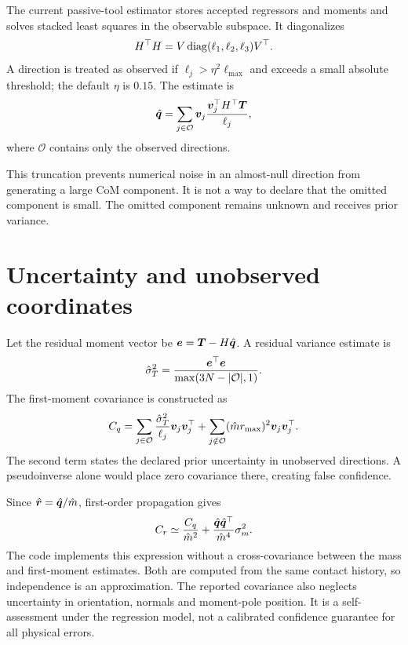 The current passive-tool estimator stores accepted regressors and moments and solves stacked least squares in the observable subspace. It diagonalizes
\begin{equation}
H^\top H=V\operatorname{diag}(\ell_1,\ell_2,\ell_3)V^\top.
\end{equation}
A direction is treated as observed if $\ell_j>\eta^2\ell_{\max}$ and exceeds a small absolute threshold; the default $\eta$ is $0.15$. The estimate is
\begin{equation}
\hat{\bm{q}}=\sum_{j\in\mathcal O}
\bm{v}_j\frac{\bm{v}_j^\top H^\top\bm{T}}{\ell_j},
\label{eq:subspace-estimator}
\end{equation}
where $\mathcal O$ contains only the observed directions.

This truncation prevents numerical noise in an almost-null direction from generating a large CoM component. It is not a way to declare that the omitted component is small. The omitted component remains unknown and receives prior variance.

\section{Uncertainty and unobserved coordinates}

Let the residual moment vector be $\bm{e}=\bm{T}-H\hat{\bm{q}}$. A residual variance estimate is
\begin{equation}
\hat\sigma_T^2=\frac{\bm{e}^\top\bm{e}}{\max(3N-|\mathcal O|,1)}.
\end{equation}
The first-moment covariance is constructed as
\begin{equation}
C_q=\sum_{j\in\mathcal O}\frac{\hat\sigma_T^2}{\ell_j}\bm{v}_j\bm{v}_j^\top
+\sum_{j\notin\mathcal O}(\hat m r_{\max})^2\bm{v}_j\bm{v}_j^\top.
\label{eq:cov-unobserved}
\end{equation}
The second term states the declared prior uncertainty in unobserved directions. A pseudoinverse alone would place zero covariance there, creating false confidence.

Since $\hat{\bm{r}}=\hat{\bm{q}}/\hat m$, first-order propagation gives
\begin{equation}
C_r\simeq \frac{C_q}{\hat m^2}
+\frac{\hat{\bm{q}}\hat{\bm{q}}^\top}{\hat m^4}\sigma_m^2.
\label{eq:mass-propagation}
\end{equation}
The code implements this expression without a cross-covariance between the mass and first-moment estimates. Both are computed from the same contact history, so independence is an approximation. The reported covariance also neglects uncertainty in orientation, normals and moment-pole position. It is a self-assessment under the regression model, not a calibrated confidence guarantee for all physical errors.


